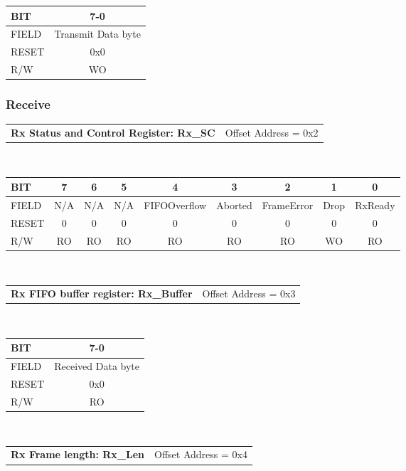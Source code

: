 \documentclass[a4paper,11pt]{article}
\begin{document}
\begin{tabular}{|l||c|}
\hline
\hline
BIT   & 7-0\\ 
\hline
FIELD & Transmit Data byte\\
\hline
RESET & 0x0\\
\hline
R/W   & WO\\
\hline
\end{tabular}

\subsubsection{Receive}

\begin{tabular}{l l}
\textbf{Rx Status and Control Register: Rx\_SC} & Offset Address = 0x2\\
\end{tabular}\\

\begin{tabular}{|l||c|c|c|c|c|c|c|c|}
\hline
\hline
BIT   & 7 & 6 & 5 & 4 & 3 & 2 & 1 & 0\\ 
\hline
FIELD &N/A &N/A &N/A & FIFOOverflow& Aborted& FrameError& Drop& RxReady\\
\hline
RESET & 0& 0& 0& 0& 0& 0& 0& 0\\
\hline
R/W   & RO& RO& RO&   RO&  RO&   RO&  WO& RO\\
\hline
\end{tabular}\\


\begin{tabular}{l l}
\textbf{Rx FIFO buffer register: Rx\_Buffer} & Offset Address = 0x3\\
\end{tabular}\\

\begin{tabular}{|l||c|}
\hline
\hline
BIT   & 7-0\\ 
\hline
FIELD & Received Data byte\\
\hline
RESET & 0x0\\
\hline
R/W   & RO\\
\hline
\end{tabular}\\

\begin{tabular}{l l}
\textbf{Rx Frame length: Rx\_Len} & Offset Address = 0x4\\
\end{tabular}\\
\end{document}
